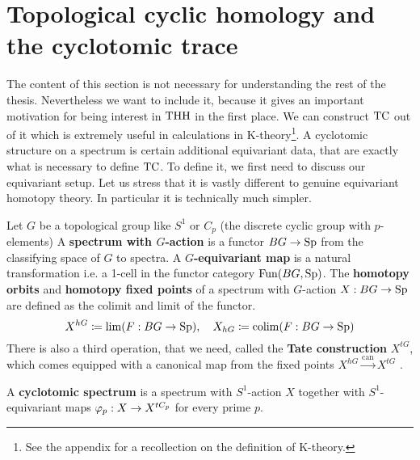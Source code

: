 \section{Topological cyclic homology and the cyclotomic trace} \label{TC}
The content of this section is not necessary for understanding the rest of the thesis. Nevertheless we want to include it, because it gives an important motivation for being interest in $\operatorname{THH}$ in the first place. We can construct $\operatorname{TC}$ out of it which is extremely useful in calculations in K-theory\footnote{See the appendix for a recollection on the definition of K-theory.}. 
A cyclotomic structure on a spectrum is certain additional equivariant data, that are exactly what is necessary to define $\operatorname{TC}$.
To define it, we first need to discuss our equivariant setup. Let us stress that it is vastly different to genuine equivariant homotopy theory. In particular it is technically much simpler.
\begin{defn}
    Let $G$ be a topological group like $S^1$ or $C_p$ (the discrete cyclic group with $p$-elements) 
    A \textbf{spectrum with $G$-action} is a functor $BG\to \operatorname{Sp}$ from the classifying space of $G$ to spectra. A \textbf{$G$-equivariant map} is a natural transformation i.e. a 1-cell in the functor category $\operatorname{Fun}(BG,\operatorname{Sp})$. The \textbf{homotopy orbits} and \textbf{homotopy fixed points} of a spectrum with $G$-action $X:BG\to \operatorname{Sp}$ are defined as the colimit and limit of the functor.
    \begin{equation*}
        X^{hG}\coloneqq \lim(F:BG\to \operatorname{Sp}),\quad X_{hG}\coloneqq \operatorname{colim}(F:BG\to \operatorname{Sp})
    \end{equation*}
    There is also a third operation, that we need, called the \textbf{Tate construction} $X^{tG}$, which comes equipped with a canonical map from the fixed points $X^{hG}\xrightarrow{\mathrm{can}}X^{tG}$ . 
\end{defn}

\begin{defn}\cite[Chapter~2.1]{NS}
A \textbf{cyclotomic spectrum} is a spectrum with $S^1$-action $X$ together with  $S^1$-equivariant maps $\varphi_p: X \rightarrow X^{tC_p}$ for every prime $p$.
\end{defn}

